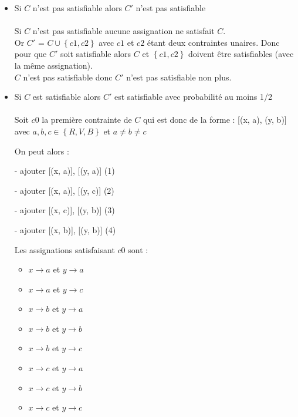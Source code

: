 \documentclass{report}
\begin{document}
\begin{itemize}
  \item Si $C$ n’est pas satisfiable alors $C'$ n'est pas satisfiable\\\\
    Si $C$ n'est pas satisfiable aucune assignation ne satisfait $C$.\\
    Or $C'$ = $C \cup \left\{c1, c2\right\}$ avec $c1$ et $c2$ étant deux contraintes unaires. Donc pour que $C'$ soit satisfiable alors $C$ et $\left\{c1, c2\right\}$ doivent être satisfiables (avec la même assignation).\\
    $C$ n'est pas satisfiable donc $C'$ n'est pas satisfiable non plus.\\

\item Si $C$ est satisfiable alors $C'$ est satisfiable avec probabilité au moins 1/2\\\\
Soit $c0$ la première contrainte de $C$ qui est donc de la forme : [(x, a), (y, b)] avec $a, b, c \in \left\{R, V, B\right\}$ et $a \neq b \neq c$

On peut alors :

- ajouter [(x, a)], [(y, a)] (1)

- ajouter [(x, a)], [(y, c)] (2)

- ajouter [(x, c)], [(y, b)] (3)

- ajouter [(x, b)], [(y, b)] (4)

Les assignations satisfaisant $c0$ sont :

\begin{itemize}
    \item[] $x \rightarrow a$ et $y \rightarrow a$
    \item[] $x \rightarrow a$ et $y \rightarrow c$
    \item[] $x \rightarrow b$ et $y \rightarrow a$
    \item[] $x \rightarrow b$ et $y \rightarrow b$
    \item[] $x \rightarrow b$ et $y \rightarrow c$
    \item[] $x \rightarrow c$ et $y \rightarrow a$
    \item[] $x \rightarrow c$ et $y \rightarrow b$
    \item[] $x \rightarrow c$ et $y \rightarrow c$
\end{itemize}
      

\end{itemize}
\end{document}
